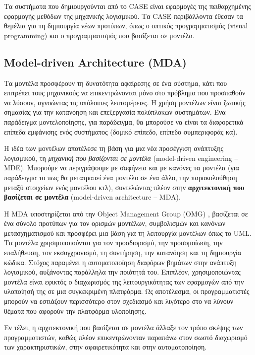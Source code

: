             Τα συστήματα που δημιουργούνται από το CASE είναι εφαρμογές της πειθαρχημένης εφαρμογής μεθόδων της μηχανικής λογισμικού.
            Τα CASE περιβάλλοντα έθεσαν τα θεμέλια για τη δημιουργία νέων προτύπων, όπως ο οπτικός προγραμματισμός (visual programming) και ο προγραμματισμός που βασίζεται σε μοντέλα. \cite{CASEChikofsky, Case1985, CASEKuhn, AdoptionCASE}

        \subsection{Model-driven Architecture (MDA)}
            Τα μοντέλα προσφέρουν τη δυνατότητα αφαίρεσης σε ένα σύστημα, κάτι που επιτρέπει τους μηχανικούς να επικεντρώνονται μόνο στο πρόβλημα που προσπαθούν να λύσουν, αγνοώντας τις υπόλοιπες λεπτομέρειες. Η χρήση μοντέλων είναι ζωτικής σημασίας για την κατανόηση και επεξεργασία πολύπλοκων συστημάτων. Ένα παράδειγμα μοντελοποίησης, για παράδειγμα, θα μπορούσε να είναι τα διαφορετικά επίπεδα εμφάνισης ενός συστήματος (δομικό επίπεδο, επίπεδο συμπεριφοράς κα).

            Η ιδέα των μοντέλων αποτέλεσε τη βάση για μια νέα προσέγγιση ανάπτυξης λογισμικού, τη \textit{μηχανική που βασίζονται σε μοντέλα} (model-driven engineering -- MDE). Μπορούμε να περιγράψουμε με σαφήνεια και με κανόνες τα μοντέλα (για παράδειγμα το πως θα μετατραπεί ένα μοντέλο σε ένα άλλο, την παρακολούθηση μεταξύ στοιχείων ενός μοντέλου κτλ), συντελώντας πλέον στην \textbf{αρχιτεκτονική που βασίζεται σε μοντέλα} (model-driven architecture -- MDA).

            Η MDA υποστηρίζεται από την Object Management Group (OMG) \cite{OMG_MDA}, βασίζεται σε ένα σύνολο προτύπων για τον ορισμών μοντέλων, συμβολισμών και κανόνων μετασχηματισμού και προσφέρει μια βάση για τη λειτουργία μοντέλων όπως το UML. Τα μοντέλα χρησιμοποιούνται για τον προσδιορισμό, την προσομοίωση, την επαλήθευση, τον εκσυγχρονισμό, τη συντήρηση, την κατανόηση και τη δημιουργία κώδικα. Στόχος παραμένει η αυτοματοποίηση διαφόρων βημάτων στην ανάπτυξη λογισμικού, αυξάνοντας παράλληλα την ποιότητά του. Επιπλέον, χρησιμοποιώντας μοντέλα είναι εφικτός ο διαχωρισμός της λειτουργικότητας των εφαρμογών από την υλοποίησή της σε μια συγκεκριμένη πλατφόρμα. Ως αποτέλεσμα, οι προγραμματιστές μπορούν να εστιάζουν περισσότερο στον σχεδιασμό και λιγότερο στο να λύνουν θέματα που αφορούν την πλατφόρμα υλοποίησης.

            Εν τέλει, η αρχιτεκτονική που βασίζεται σε μοντέλα άλλαξε τον τρόπο σκέψης των προγραμματιστών, καθώς πλέον επικεντρώνονταν παραπάνω στον σωστό διαχωρισμό των χαρακτηριστικών, στην αφαιρετικότητα και στην αυτοματοποίηση.
            \cite{Bucaioni2022, MDELow, MDSDSpringer}

